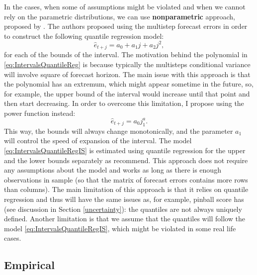 \documentclass[
]{book}
\theoremstyle{definition}
\theoremstyle{definition}
\theoremstyle{definition}
\theoremstyle{definition}
\theoremstyle{remark}
\begin{document}
In the cases, when some of assumptions might be violated and when we cannot rely on the parametric distributions, we can use \textbf{nonparametric} approach, proposed by \citet{Taylor1999}. The authors proposed using the multistep forecast errors in order to construct the following quantile regression model:
\begin{equation}
    \hat{e}_{t+j} = a_0 + a_1 j + a_2 j^2,
    \label{eq:IntervalsQuantileReg}
\end{equation}
for each of the bounds of the interval. The motivation behind the polynomial in \eqref{eq:IntervalsQuantileReg} is because typically the multisteps conditional variance will involve square of forecast horizon. The main issue with this approach is that the polynomial has an extremum, which might appear sometime in the future, so, for example, the upper bound of the interval would increase until that point and then start decreasing. In order to overcome this limitation, I propose using the power function instead:
\begin{equation}
    \hat{e}_{t+j} = a_0 j^a_1 .
    \label{eq:IntervalsQuantileRegIS}
\end{equation}
This way, the bounds will always change monotonically, and the parameter \(a_1\) will control the speed of expansion of the interval. The model \eqref{eq:IntervalsQuantileRegIS} is estimated using quantile regression for the upper and the lower bounds separately as \citet{Taylor1999} recommend. This approach does not require any assumptions about the model and works as long as there is enough observations in sample (so that the matrix of forecast errors contains more rows than columns). The main limitation of this approach is that it relies on quantile regression and thus will have the same issues as, for example, pinball score has (see discussion in Section \ref{uncertainty}): the quantiles are not always uniquely defined. Another limitation is that we assume that the quantiles will follow the model \eqref{eq:IntervalsQuantileRegIS}, which might be violated in some real life cases.

\hypertarget{empirical}{%
\subsection{Empirical}\label{empirical}}
\end{document}
